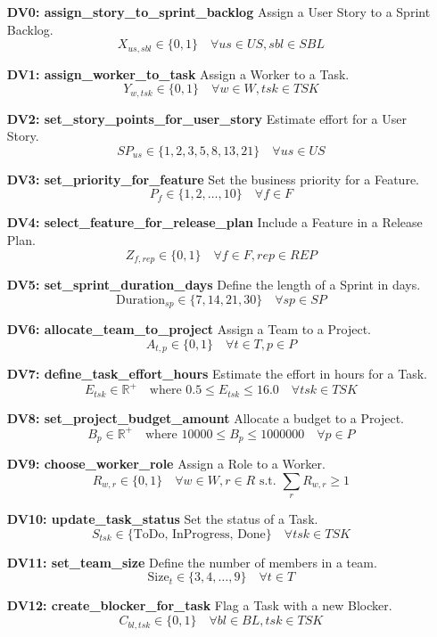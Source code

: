 \documentclass[11pt]{article}
\begin{document}
\begin{itemize}
    \item[\textbf{DV0: assign\_story\_to\_sprint\_backlog}] Assign a User Story to a Sprint Backlog.
    $$ X_{us, sbl} \in \{0, 1\} \quad \forall us \in US, sbl \in SBL $$
    
    \item[\textbf{DV1: assign\_worker\_to\_task}] Assign a Worker to a Task.
    $$ Y_{w, tsk} \in \{0, 1\} \quad \forall w \in W, tsk \in TSK $$
    
    \item[\textbf{DV2: set\_story\_points\_for\_user\_story}] Estimate effort for a User Story.
    $$ SP_{us} \in \{1, 2, 3, 5, 8, 13, 21\} \quad \forall us \in US $$
    
    \item[\textbf{DV3: set\_priority\_for\_feature}] Set the business priority for a Feature.
    $$ P_{f} \in \{1, 2, \dots, 10\} \quad \forall f \in F $$
    
    \item[\textbf{DV4: select\_feature\_for\_release\_plan}] Include a Feature in a Release Plan.
    $$ Z_{f, rep} \in \{0, 1\} \quad \forall f \in F, rep \in REP $$
    
    \item[\textbf{DV5: set\_sprint\_duration\_days}] Define the length of a Sprint in days.
    $$ \text{Duration}_{sp} \in \{7, 14, 21, 30\} \quad \forall sp \in SP $$
    
    \item[\textbf{DV6: allocate\_team\_to\_project}] Assign a Team to a Project.
    $$ A_{t, p} \in \{0, 1\} \quad \forall t \in T, p \in P $$
    
    \item[\textbf{DV7: define\_task\_effort\_hours}] Estimate the effort in hours for a Task.
    $$ E_{tsk} \in \mathbb{R}^+ \quad \text{where } 0.5 \leq E_{tsk} \leq 16.0 \quad \forall tsk \in TSK $$
    
    \item[\textbf{DV8: set\_project\_budget\_amount}] Allocate a budget to a Project.
    $$ B_{p} \in \mathbb{R}^+ \quad \text{where } 10000 \leq B_{p} \leq 1000000 \quad \forall p \in P $$
    
    \item[\textbf{DV9: choose\_worker\_role}] Assign a Role to a Worker.
    $$ R_{w, r} \in \{0, 1\} \quad \forall w \in W, r \in R \text{ s.t. } \sum_r R_{w,r} \geq 1 $$
    
    \item[\textbf{DV10: update\_task\_status}] Set the status of a Task.
    $$ S_{tsk} \in \{\text{ToDo, InProgress, Done}\} \quad \forall tsk \in TSK $$
    
    \item[\textbf{DV11: set\_team\_size}] Define the number of members in a team.
    $$ \text{Size}_{t} \in \{3, 4, \dots, 9\} \quad \forall t \in T $$
    
    \item[\textbf{DV12: create\_blocker\_for\_task}] Flag a Task with a new Blocker.
    $$ C_{bl, tsk} \in \{0, 1\} \quad \forall bl \in BL, tsk \in TSK $$
\end{itemize}
\end{document}
